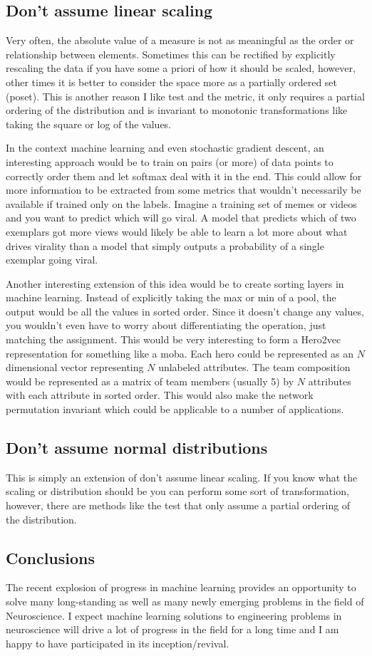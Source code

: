 \subsection{Don't assume linear scaling}
Very often, the absolute value of a measure is not as meaningful as the order or relationship between elements. Sometimes this can be rectified by explicitly rescaling the data if you have some a priori of how it should be scaled, however, other times it is better to consider the space more as a partially ordered set (poset). This is another reason I like \KS test and the \KS metric, it only requires a partial ordering of the distribution and is invariant to monotonic transformations like taking the square or log of the values.

In the context machine learning and even stochastic gradient descent, an interesting approach would be to train on pairs (or more) of data points to correctly order them and let softmax deal with it in the end. This could allow for more information to be extracted from some metrics that wouldn't necessarily be available if trained only on the labels. Imagine a training set of memes or videos and you want to predict which will go viral. A model that predicts which of two exemplars got more views would likely be able to learn a lot more about what drives virality than a model that simply outputs a probability of a single exemplar going viral.

Another interesting extension of this idea would be to create sorting layers in machine learning. Instead of explicitly taking the max or min of a pool, the output would be all the values in sorted order. Since it doesn't change any values, you wouldn't even have to worry about differentiating the operation, just matching the assignment. This would be very interesting to form a Hero2vec representation for something like a moba. Each hero could be represented as an $N$ dimensional vector representing $N$ unlabeled attributes. The team composition would be represented as a matrix of team members (usually 5) by $N$ attributes with each attribute in sorted order. This would also make the network permutation invariant which could be applicable to a number of applications.

\subsection{Don't assume normal distributions}
This is simply an extension of don't assume linear scaling. If you know what the scaling or distribution should be you can perform some sort of transformation, however, there are methods like the \KS test that only assume a partial ordering of the distribution.

\subsection{Conclusions}
The recent explosion of progress in machine learning provides an opportunity to solve many long-standing as well as many newly emerging problems in the field of Neuroscience. I expect machine learning solutions to engineering problems in neuroscience will drive a lot of progress in the field for a long time and I am happy to have participated in its inception/revival.